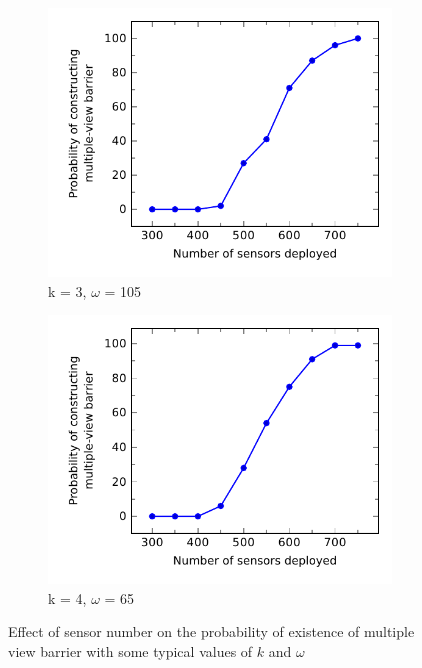 %
\begin{figure}[h]
	\begin{subfigure}{.5\textwidth}
		\centering
		\includegraphics[scale=.8]{Hinhanh/SensorNumberEffect/probability/k3omega105.pdf}
		\caption{k = 3, $\omega$ = 105}
	\end{subfigure}
	\begin{subfigure}{.5\textwidth}
		\centering
		\includegraphics[scale=.8]{Hinhanh/SensorNumberEffect/probability/k4omega65.pdf}
		\caption{k = 4, $\omega$ = 65}
	\end{subfigure}
\caption{Effect of sensor number on the probability of existence of multiple view barrier with some typical values of $k$ and $\omega$}
\label{fig:}
\end{figure}

